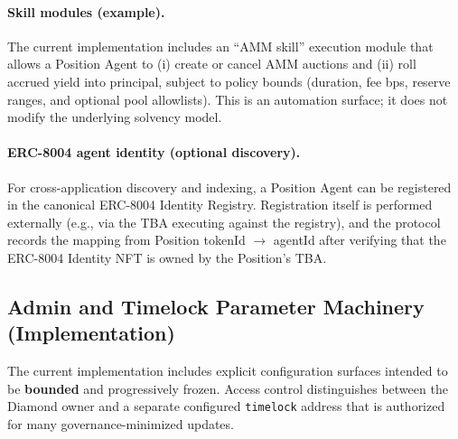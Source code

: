 \documentclass[version=preprint]{iacrcc}
\begin{document}
\paragraph{Skill modules (example).}
The current implementation includes an ``AMM skill'' execution module that allows a Position Agent to (i) create or cancel AMM auctions and (ii) roll accrued yield into principal, subject to policy bounds (duration, fee bps, reserve ranges, and optional pool allowlists). This is an automation surface; it does not modify the underlying solvency model.

\paragraph{ERC-8004 agent identity (optional discovery).}
For cross-application discovery and indexing, a Position Agent can be registered in the canonical ERC-8004 Identity Registry. Registration itself is performed externally (e.g., via the TBA executing against the registry), and the protocol records the mapping from Position tokenId $\rightarrow$ agentId after verifying that the ERC-8004 Identity NFT is owned by the Position's TBA.

\subsection{Admin and Timelock Parameter Machinery (Implementation)}

The current implementation includes explicit configuration surfaces intended to be \textbf{bounded} and progressively frozen. Access control distinguishes between the Diamond owner and a separate configured \texttt{timelock} address that is authorized for many governance-minimized updates.
\end{document}
